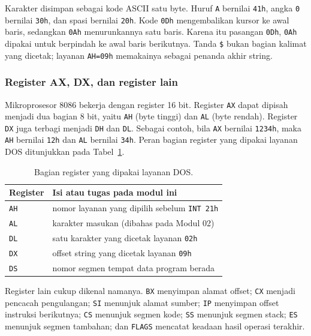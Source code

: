 Karakter disimpan sebagai kode ASCII satu byte. Huruf \texttt{A}
bernilai \texttt{41h}, angka \texttt{0} bernilai \texttt{30h}, dan
spasi bernilai \texttt{20h}. Kode \texttt{0Dh} mengembalikan kursor
ke awal baris, sedangkan \texttt{0Ah} menurunkannya satu baris.
Karena itu pasangan \texttt{0Dh}, \texttt{0Ah} dipakai untuk
berpindah ke awal baris berikutnya. Tanda \texttt{\$} bukan bagian
kalimat yang dicetak; layanan \texttt{AH=09h} memakainya sebagai
penanda akhir string.

\subsubsection*{Register AX, DX, dan register lain}

Mikroprosesor 8086 bekerja dengan register 16 bit. Register
\texttt{AX} dapat dipisah menjadi dua bagian 8 bit, yaitu
\texttt{AH} (byte tinggi) dan \texttt{AL} (byte rendah). Register
\texttt{DX} juga terbagi menjadi \texttt{DH} dan \texttt{DL}.
Sebagai contoh, bila \texttt{AX} bernilai \texttt{1234h}, maka
\texttt{AH} bernilai \texttt{12h} dan \texttt{AL} bernilai
\texttt{34h}. Peran bagian register yang dipakai layanan DOS
ditunjukkan pada Tabel~\ref{tab:m00-register}.

\begin{table}[H]
    \centering
    \caption{Bagian register yang dipakai layanan DOS.}
    \label{tab:m00-register}
    \small
    \begin{tabular}{@{}ll@{}}
        \toprule
        \textbf{Register} & \textbf{Isi atau tugas pada modul ini} \\
        \midrule
        \texttt{AH} & nomor layanan yang dipilih sebelum \texttt{INT 21h} \\
        \texttt{AL} & karakter masukan (dibahas pada Modul 02) \\
        \texttt{DL} & satu karakter yang dicetak layanan \texttt{02h} \\
        \texttt{DX} & offset string yang dicetak layanan \texttt{09h} \\
        \texttt{DS} & nomor segmen tempat data program berada \\
        \bottomrule
    \end{tabular}
\end{table}

Register lain cukup dikenal namanya. \texttt{BX} menyimpan alamat
offset; \texttt{CX} menjadi pencacah pengulangan; \texttt{SI}
menunjuk alamat sumber; \texttt{IP} menyimpan offset instruksi
berikutnya; \texttt{CS} menunjuk segmen kode; \texttt{SS} menunjuk
segmen stack; \texttt{ES} menunjuk segmen tambahan; dan
\texttt{FLAGS} mencatat keadaan hasil operasi terakhir.

